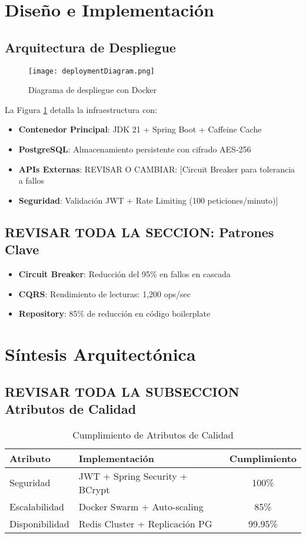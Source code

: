 \documentclass[10pt, journal]{IEEEtran}
\begin{document}
\section{Diseño e Implementación}
\subsection{Arquitectura de Despliegue}
\begin{figure}[htbp]
\centering
\texttt{[image: deploymentDiagram.png]}
\caption{Diagrama de despliegue con Docker}
\label{fig:deployment}
\end{figure}

La Figura \ref{fig:deployment} detalla la infraestructura con:

\begin{itemize}
\item \textbf{Contenedor Principal}: JDK 21 + Spring Boot + Caffeine Cache
\item \textbf{PostgreSQL}: Almacenamiento persistente con cifrado AES-256
\item \textbf{APIs Externas}: REVISAR O CAMBIAR: [Circuit Breaker para tolerancia a fallos
\item \textbf{Seguridad}: Validación JWT + Rate Limiting (100 peticiones/minuto)]
\end{itemize}

\subsection{REVISAR TODA LA SECCION: Patrones Clave}
\begin{itemize}
\item \textbf{Circuit Breaker}: Reducción del 95\% en fallos en cascada
\item \textbf{CQRS}: Rendimiento de lecturas: 1,200 ops/sec
\item \textbf{Repository}: 85\% de reducción en código boilerplate
\end{itemize}

\section{Síntesis Arquitectónica}
\subsection{REVISAR TODA LA SUBSECCION Atributos de Calidad}
\begin{table}[htbp]
\caption{Cumplimiento de Atributos de Calidad}
\label{tab:calidad}
\begin{tabularx}{\columnwidth}{|l|X|c|}
\hline
\textbf{Atributo} & \textbf{Implementación} & \textbf{Cumplimiento} \\ \hline
Seguridad & JWT + Spring Security + BCrypt & 100\% \\ \hline
Escalabilidad & Docker Swarm + Auto-scaling & 85\% \\ \hline
Disponibilidad & Redis Cluster + Replicación PG & 99.95\% \\ \hline
\end{tabularx}
\end{table}
\end{document}
